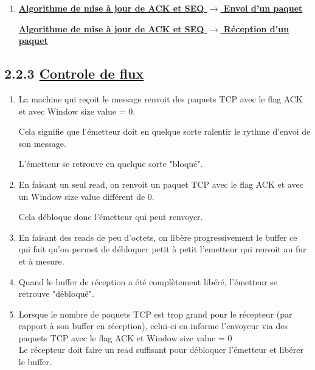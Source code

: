 \documentclass{article}
\begin{document}
\begin{enumerate}[resume]
	\item 

\underline{\textbf{Algorithme de mise à jour de ACK et SEQ $\rightarrow$ Envoi d'un paquet}}\\

\begin{algorithm}
\end{algorithm}


\underline{\textbf{Algorithme de mise à jour de ACK et SEQ $\rightarrow$ Réception d'un paquet}}\\

\begin{algorithm}
\end{algorithm}

\end{enumerate}

\subsection*{2.2.3 \underline{Controle de flux}}

\begin{enumerate}[resume]

	\item La machine qui reçoit le message renvoit des paquets TCP avec le flag ACK et avec Window size value = 0.

Cela signifie que l'émetteur doit en quelque sorte ralentir le rythme d'envoi de son message.

L'émetteur se retrouve en quelque sorte "bloqué".

	\item En faisant un seul read, on renvoit un paquet TCP avec le flag ACK et avec un Window size value différent de 0.

Cela débloque donc l'émetteur qui peut renvoyer.

	\item En faisant des reads de peu d'octets, on libère progressivement le buffer ce qui fait qu'on permet de débloquer petit à petit l'emetteur qui renvoit au fur et à mesure.

	\item Quand le buffer de réception a été complètement libéré, l'émetteur se retrouve "débloqué".	

	\item Lorsque le nombre de paquets TCP est trop grand pour le récepteur (par rapport à son buffer en réception), celui-ci en informe l'envoyeur via des paquets TCP avec le flag ACK et Window size value = 0\\

Le récepteur doit faire un read suffisant pour débloquer l'émetteur et libérer le buffer.

\end{enumerate}
\end{document}
